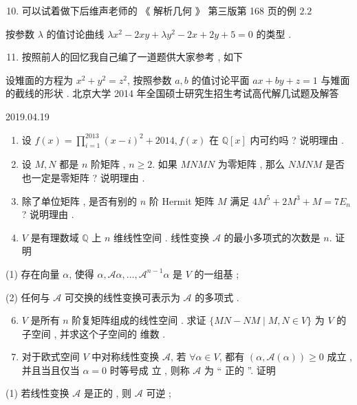 \documentclass[10pt]{article}
\begin{document}
\begin{enumerate}
  \setcounter{enumi}{9}
  \item  可以试着做下后维声老师的 《 解析几何 》 第三版第  168  页的例  $2.2$
\end{enumerate}
 按参数  $\lambda$  的值讨论曲线  $\lambda x^{2}-2 x y+\lambda y^{2}-2 x+2 y+5=0$  的类型 .

\begin{enumerate}
  \setcounter{enumi}{10}
  \item  按照前人的回忆我自己编了一道题供大家参考 ,  如下 
\end{enumerate}
 设雉面的方程为  $x^{2}+y^{2}=z^{2}$,  按照参数  $a, b$  的值讨论平面  $a x+b y+z=1$  与雉面的截线的形状 .  北京大学  2014  年全国硕士研究生招生考试高代解几试题及解答     

2019.04.19

\begin{enumerate}
  \item  设  $f(x)=\prod_{i=1}^{2013}(x-i)^{2}+2014, f(x)$  在  $\mathbb{Q}[x]$  内可约吗 ?  说明理由 .

  \item  设  $M, N$  都是  $n$  阶矩阵 , $n \geqslant 2$.  如果  $M N M N$  为零矩阵 ,  那么  $N M N M$  是否也一定是零矩阵 ?  说明理由 .

  \item  除了单位矩阵 ,  是否有别的  $n$  阶  Hermit  矩阵  $M$  满足  $4 M^{5}+2 M^{3}+M=7 E_{n}$ ?  说明理由 .

  \item $V$  是有理数域  $\mathbb{Q}$  上  $n$  维线性空间 .  线性变换  $\mathcal{A}$  的最小多项式的次数是  $n$.  证明 

\end{enumerate}
(1)  存在向量  $\alpha$,  使得  $\alpha, \mathcal{A} \alpha, \ldots, \mathcal{A}^{n-1} \alpha$  是  $V$  的一组基 ;

(2)  任何与  $\mathcal{A}$  可交换的线性变换可表示为  $\mathcal{A}$  的多项式 .

\begin{enumerate}
  \setcounter{enumi}{5}
  \item $V$  是所有  $n$  阶复矩阵组成的线性空间 .  求证  $\{M N-N M \mid M, N \in V\}$  为  $V$  的子空间 ,  并求这个子空间的   维数 .

  \item  对于欧式空间  $V$  中对称线性变换  $\mathcal{A}$,  若  $\forall \alpha \in V$,  都有  $(\alpha, \mathcal{A}(\alpha)) \geqslant 0$  成立 ,  并且当且仅当  $\alpha=0$  时等号成   立 ,  则称  $\mathcal{A}$  为  “ 正的 ”.  证明 

\end{enumerate}
(1)  若线性变换  $\mathcal{A}$  是正的 ,  则  $\mathcal{A}$  可逆 ;
\end{document}
